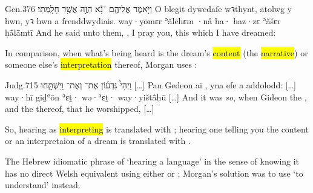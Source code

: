 \begin{example}{Gen.}{37}{6}{}{}
	\quoling
	{וַיֹּ֖אמֶר אֲלֵיהֶ֑ם ־נָ֕א  הַזֶּ֖ה אֲשֶׁ֥ר חָלָֽמְתִּי׃}
	{O blegit dywedaſe wꝛthynt,  atolwg y  hwn, yꝛ hwn a frenddwydiais.}
	{way·yōmɛr ʾălēhɛm ·nå̄ ha· haz·zɛ ʾăšɛr ḥå̄lå̄mtī}
	{And he said unto them, , I pray you, this  which I have dreamed:}
\end{example}

\begin{paper}
	{\click} In comparison, when what’s being heard is the dream’s \hl{content} (the \hl{narrative}) or someone else’s \hl{interpretation} thereof, Morgan uses :
\end{paper}

\begin{example}{Judg.}{7}{15}{}{}
	\quoling
	{וַיְהִי֩  גִּדְע֜וֹן אֶת־ וְאֶת־ וַיִּשְׁתָּ֑חוּ […]}%
	{Pan  Gedeon  ai , yna efe a addolodd: […]} %
	{way·hī  giḏʿōn ʾɛṯ· wə·ʾɛṯ· way·yištå̄ḥū […]}%
	{And it was \textit{so}, when Gideon  the , and the  thereof, that he worshipped, […]}%
\end{example}

\begin{paper}
	So, hearing as \hl{interpreting} is translated with ; hearing one telling you the content or an interpretaion of a dream is translated with .
\end{paper}




\begin{paper}
	The Hebrew idiomatic phrase of ‘hearing a language’ in the sense of knowing it has no direct Welsh equivalent using either  or ; Morgan’s solution was to use  ‘to understand’ instead.
\end{paper}


